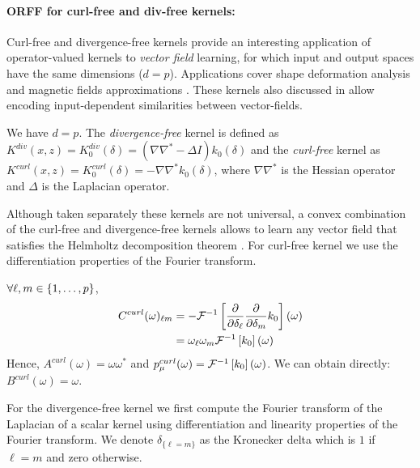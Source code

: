 \documentclass[twocolumn]{article}
\begin{document}
\paragraph{ORFF for curl-free and div-free ker\-nels:}
Curl-free and divergence-free kernels provide an interesting application of
operator-valued kernels to \emph{vector field} learning, for which input and
output spaces have the same dimensions ($d=p$). Applications cover shape
deformation analysis \citep{Micheli2013} and magnetic fields approximations
\citep{Wahlstrom2013}. These kernels also discussed in \cite{Fuselier2006}
allow encoding input-dependent similarities between vector-fields.
\begin{definition}\label{curl-div-free}
    We have $d=p$.  The \emph{divergence-free} kernel is defined as
    $K^{div}(x,z)=K^{div}_0(\delta) = (\nabla\nabla^* - \Delta I) k_0(\delta)$
    and the \emph{curl-free} kernel as
    $K^{curl}(x,z)=K_0^{curl}(\delta)=-\nabla\nabla^* k_0(\delta)$, where
    $\nabla\nabla^*$ is the Hessian operator and $\Delta$ is the Laplacian
    operator.
\end{definition}
Although taken separately these kernels are not universal, a convex combination
of the curl-free and divergence-free kernels allows to learn any vector field
that satisfies the Helmholtz decomposition theorem \citep{Macedo2008,
Baldassare2012}. For curl-free kernel we use the differentiation properties of
the Fourier transform.
\begin{example} $\forall \ell,m \in {\left\{1, \ldots, p\right\}}$,
    \begin{equation*}
        \begin{aligned}
            C^{curl}(\omega)_{\ell m}&=-\mathcal{F}^{-1}\left[\frac{\partial}{\partial
            \delta_{\ell}}\frac{\partial}{\partial \delta_{m}}k_0\right](\omega) \\
            &= \omega_{\ell}\omega_m \mathcal{F}^{-1}\left[k_0\right](\omega)
        \end{aligned}
    \end{equation*}
    Hence, $A^{curl}(\omega)=\omega\omega^*$ and
    $p_{\mu}^{curl}(\omega)=\mathcal{F}^{-1}\left[k_0\right](\omega)$. We can obtain directly:
    $B^{curl}(\omega)=\omega$.
\end{example}
For the divergence-free kernel we first compute the Fourier transform of the
Laplacian of a scalar kernel using differentiation and linearity properties of
the Fourier transform. We denote $\delta_{\{\ell=m\}}$ as the Kronecker delta
which is $1$ if $\ell=m$ and zero otherwise.
\end{document}
